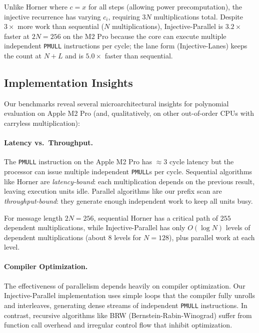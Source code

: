Unlike Horner where $c = x$ for all steps (allowing power precomputation),
the injective recurrence has varying $c_i$, requiring $3N$ multiplications total.
Despite $3\times$ more work than sequential ($N$ multiplications),
Injective-Parallel is $3.2\times$ faster at $2N = 256$ on the M2 Pro because the
core can execute multiple independent \texttt{PMULL} instructions per cycle;
the lane form (Injective-Lanes) keeps the count at $N+L$ and is $5.0\times$
faster than sequential.

\subsection{Implementation Insights}
\label{sec:experiments:implementation}

Our benchmarks reveal several microarchitectural insights for polynomial evaluation
on Apple M2 Pro (and, qualitatively, on other out-of-order CPUs with carryless multiplication):

\paragraph{Latency vs.\ Throughput.}
The \texttt{PMULL} instruction on the Apple M2 Pro has $\approx 3$ cycle latency but the
processor can issue multiple independent \texttt{PMULL}s per cycle.
Sequential algorithms like Horner are \emph{latency-bound}: each multiplication
depends on the previous result, leaving execution units idle.
Parallel algorithms like our prefix scan are \emph{throughput-bound}: they generate
enough independent work to keep all units busy.

For message length $2N=256$, sequential Horner has a critical path of $255$ dependent multiplications,
while Injective-Parallel has only $O(\log N)$ levels of dependent multiplications (about 8 levels for $N=128$),
plus parallel work at each level.

\paragraph{Compiler Optimization.}
The effectiveness of parallelism depends heavily on compiler optimization.
Our Injective-Parallel implementation uses simple loops that the compiler
fully unrolls and interleaves, generating dense streams of independent \texttt{PMULL}
instructions.
In contrast, recursive algorithms like BRW (Bernstein-Rabin-Winograd) suffer from
function call overhead and irregular control flow that inhibit optimization.

